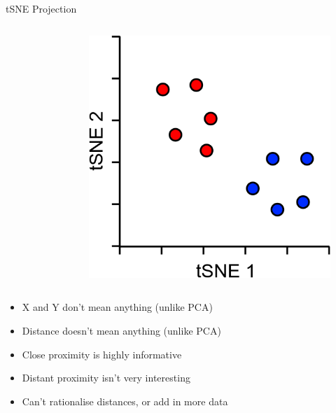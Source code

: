 \begin{frame}[allowframebreaks]{tSNE Projection}
\begin{columns}
\begin{column}{0.2\textwidth}
\begin{figure}
        \end{figure}
    \end{column}
    \begin{column}{0.2\textwidth}
        \begin{figure}
            \centering
            \includegraphics[width=1\textwidth,keepaspectratio]{images/dul/dim-reduce/slide_31_5_img.png}
        \end{figure}
    \end{column}
    \end{columns}

    \vspace{3em}
    \begin{itemize}
        \item X and Y don’t mean anything (unlike PCA)
        \item Distance doesn’t mean anything (unlike PCA)
        \item Close proximity is highly informative
        \item Distant proximity isn’t very interesting
        \item Can’t rationalise distances, or add in more data
    \end{itemize}
\end{frame}

